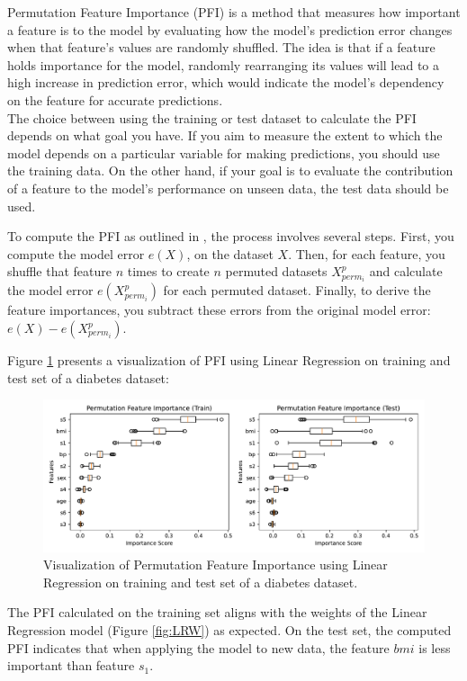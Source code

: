 Permutation Feature Importance (PFI) is a method that measures how important a feature is to the model by evaluating how the model's prediction error changes when that feature's values are randomly shuffled. The idea is that if a feature holds importance for the model, randomly rearranging its values will lead to a high increase in prediction error, which would indicate the model's dependency on the feature for accurate predictions.\\
The choice between using the training or test dataset to calculate the PFI depends on what goal you have. If you aim to measure the extent to which the model depends on a particular variable for making predictions, you should use the training data. On the other hand, if your goal is to evaluate the contribution of a feature to the model's performance on unseen data, the test data should be used. 

To compute the PFI as outlined in \cite{fisher2019all}, the process involves several steps. First, you compute the model error \( e(X) \), on the dataset \( X \). Then, for each feature, you shuffle that feature \( n \) times to create \( n \) permuted datasets \( X^p_{perm_i} \) and calculate the model error \( e(X^p_{perm_i}) \) for each permuted dataset. Finally, to derive the feature importances, you subtract these errors from the original model error: \( e(X) - e(X^p_{perm_i}) \).

Figure \ref{fig:pfi} presents a visualization of PFI using Linear Regression on training and test set of a diabetes dataset:

\begin{figure}[H]
    \centering
    \includegraphics[width=1\linewidth]{pics/Permutation_Feature_Importance.pdf}
    \caption[Visualization of PFI using LR.]{Visualization of Permutation Feature Importance using Linear Regression on training and test set of a diabetes dataset.}
    \label{fig:pfi}
\end{figure}

The PFI calculated on the training set aligns with the weights of the Linear Regression model (Figure \ref{fig:LRW}) as expected. On the test set, the computed PFI indicates that when applying the model to new data, the feature $bmi$ is less important than feature $s_1$.

